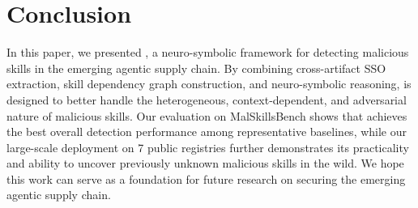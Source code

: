 \section{Conclusion}
In this paper, we presented \toolname, a neuro-symbolic framework for detecting malicious skills in the emerging agentic supply chain. By combining cross-artifact SSO extraction, skill dependency graph construction, and neuro-symbolic reasoning, \toolname is designed to better handle the heterogeneous, context-dependent, and adversarial nature of malicious skills.
Our evaluation on MalSkillsBench shows that \toolname achieves the best overall detection performance among representative baselines, while our large-scale deployment on 7 public registries further demonstrates its practicality and ability to uncover previously unknown malicious skills in the wild. We hope this work can serve as a foundation for future research on securing the emerging agentic supply chain.